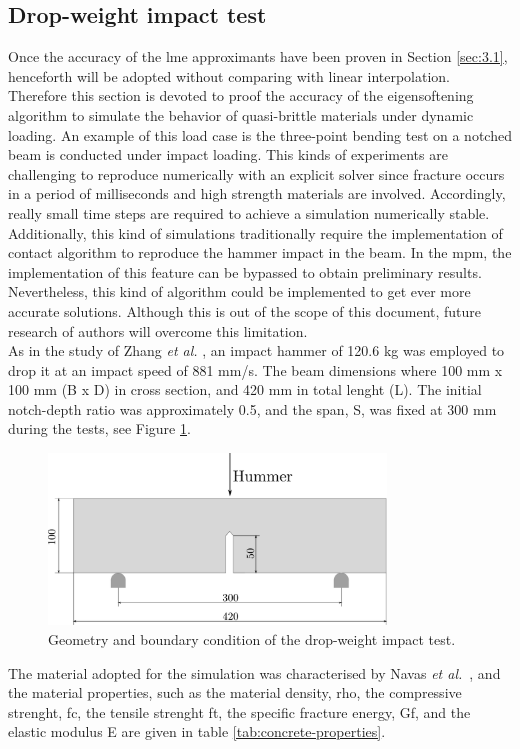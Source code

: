 \documentclass[preprint,12pt,a4paper]{elsarticle}
\begin{document}
\subsection{Drop-weight impact test}
\label{sec:3.2}

Once the accuracy of the \acrshort{lme} approximants have been proven
in Section \ref{sec:3.1}, henceforth will be adopted without comparing
with linear interpolation. Therefore this section is devoted to proof
the accuracy of the eigensoftening algorithm to simulate the behavior
of quasi-brittle materials under dynamic loading. An example of this
load case is the three-point bending test on a notched beam is
conducted under impact loading. This kinds of experiments are
challenging to reproduce numerically with an explicit solver since
fracture occurs in a period of milliseconds and high strength
materials are involved. Accordingly, really small time steps are
required to achieve a simulation numerically stable. Additionally,
this kind of simulations traditionally require the implementation of
contact algorithm to reproduce the hammer impact in the beam. In the
\acrshort{mpm}, the implementation of this feature can be bypassed to
obtain preliminary results. Nevertheless, this kind of algorithm could
be implemented to get ever more accurate solutions. Although this is
out of the scope of this document, future research of authors will overcome this
limitation.\\

As in the study of Zhang {\it et al.} \cite{Zhang_2009,Zhang_2010a},
an impact hammer of 120.6 kg was employed to drop it at an impact
speed of 881 mm/s. The beam dimensions where 100 mm x 100 mm (B x D)
in cross section, and 420 mm in total lenght (L). The initial
notch-depth ratio was approximately 0.5, and the span, S, was fixed at
300 mm during the tests, see Figure
\ref{fig:geometry-drop-weight-impact-test}.
\begin{figure}
  \centering
  \includegraphics[width=0.8\textwidth]{./Figure-impact-test}
  \caption{Geometry and boundary condition of the drop-weight impact test.}
  \label{fig:geometry-drop-weight-impact-test}
\end{figure}
The material adopted for the simulation was characterised by Navas
{\it et al.}~\cite{Navas_2017_ES}, and the material properties, such
as the material density, \gls{rho}, the compressive strenght, \gls{fc},
the tensile strenght \gls{ft}, the specific fracture energy, \gls{Gf},
and the elastic modulus \gls{E} are given in table \ref{tab:concrete-properties}.\\
\end{document}
